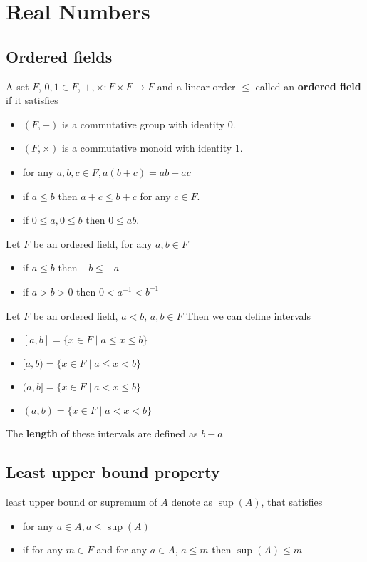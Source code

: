 \chapter{Real Numbers}
\section{Ordered fields}

\begin{definition}
  A set $F$, $0, 1 \in F$, $+, \times: F \times F \to F$ and a linear order $\le$ called an \textbf{ordered field} if it satisfies
  \begin{itemize}
    \item $(F, +)$ is a commutative group with identity $0$.
    \item $(F, \times)$ is a commutative monoid with identity $1$.
    \item for any $a, b, c \in F, a(b + c) = ab + ac$
    \item if $a \le b$ then $a + c \le b + c$ for any $c \in F$.
    \item if $0 \le a, 0 \le b$ then $0 \le ab$.
  \end{itemize}
\end{definition} 

\begin{lemma}
  Let $F$ be an ordered field, for any $a, b \in F$
  \begin{itemize}
    \item if $a \le b$ then $-b \le -a$
    \item if $a > b > 0$ then $0 < a^{-1} < b^{-1}$
  \end{itemize}
\end{lemma}

\begin{theorem}
  Let $F$ be an ordered field, $a < b$, $a, b \in F$
  Then we can define intervals
  \begin{itemize}
    \item $[a, b] = \{x \in F \mid a \le x \le b\}$
    \item $[a, b) = \{x \in F \mid a \le x < b\}$
    \item $(a, b] = \{x \in F \mid a < x \le b\}$
    \item $(a, b) = \{x \in F \mid a < x < b\}$
  \end{itemize}
  The \textbf{length} of these intervals are defined as $b - a$
\end{theorem}

\section{Least upper bound property}
\begin{definition}
  least upper bound or supremum of $A$ denote as $\sup(A)$, that satisfies
  \begin{itemize}
    \item for any $a \in A, a \le \sup(A)$
    \item if for any $m \in F$ and for any $a \in A$, $a \le m$ then $\sup(A) \le m$
  \end{itemize}
\end{definition}

